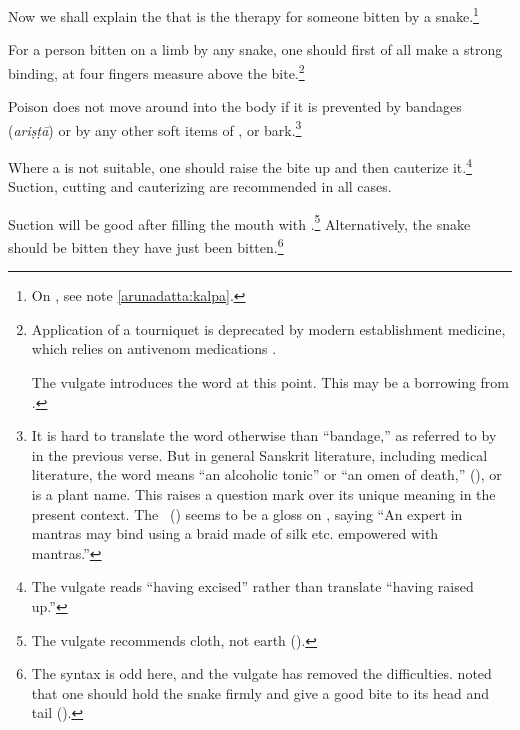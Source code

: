 \begin{translation}
    \item [1]
    Now we shall explain the  that is the therapy for 
    someone bitten by a snake.\footnote{On , see note 
    \ref{arunadatta:kalpa}.}
    
    \item[3] For a person bitten on a limb by any snake, one should first
of all make a strong binding, at four fingers measure above the
bite.\footnote{Application of a tourniquet is deprecated by modern
    establishment medicine, which relies on antivenom medications
    \citep[e.g.,][150--151 et passim in the literature]{pill-2013}.
    
    The vulgate introduces the word  at this point.  This may be a 
    borrowing from .}
    
    
    \item[4]
    
    Poison does not move around into the body if it is prevented by
bandages (\emph{ariṣṭā}) or by any other soft items of 
,  or bark.\footnote{It is hard to 
translate the word
     otherwise than “bandage,” as referred to by
     in the previous verse.  But in general Sanskrit
    literature, including medical literature, the word means “an
    alcoholic tonic” or “an omen of death,” (), or is a
    plant name.  This raises a question mark over its unique meaning in
    the present context.  The \AH\ () seems to be a gloss
    on , saying “An expert in mantras may bind using a braid made of 
    silk etc. empowered with mantras.”}
    
\item[5] Where a  is not suitable, one should raise
the bite up and then cauterize it.\footnote{The vulgate reads
     “having excised” rather than translate 
    “having raised up.”} Suction, cutting and cauterizing are recommended in
    all cases.

\item[6] Suction will be good after filling the mouth with
.\footnote{The vulgate recommends cloth, not
    earth ().}  Alternatively, the snake should be bitten
     they have just been bitten.\footnote{The 
    syntax is odd here, and the vulgate has removed the difficulties. 
     noted that one should hold the snake firmly and give a 
    good bite to its head and tail ().}


\end{translation}

